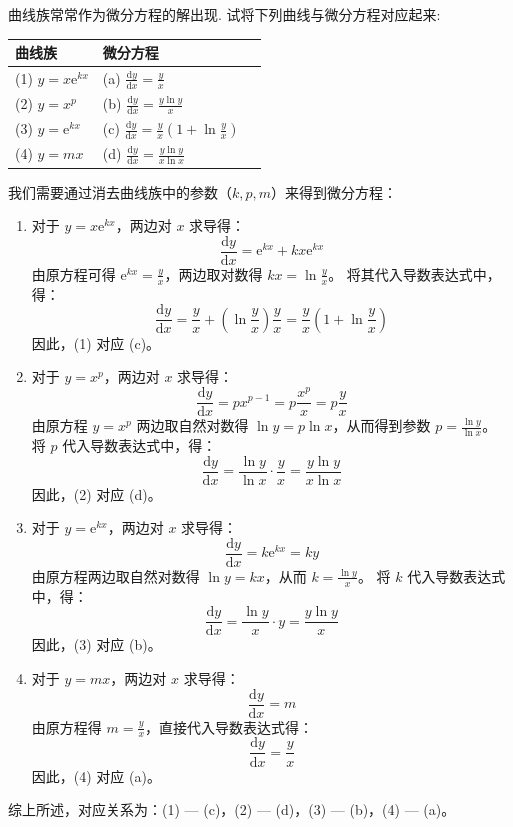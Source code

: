 \documentclass[lang=cn,11pt]{elegantbook}
\begin{document}
\begin{exercise}[曲线族对应微分方程]
曲线族常常作为微分方程的解出现. 试将下列曲线与微分方程对应起来:
\begin{center}
\begin{tabular}{@{}lll@{}}
\toprule
 \textbf{曲线族} & \textbf{微分方程} \\
\midrule
(1) $y=x\mathrm{e}^{kx}$ & (a) $\displaystyle \frac{\mathrm{d}y}{\mathrm{d}x}=\frac{y}{x}$ \\[6pt]
(2) $y=x^p$ & (b) $\displaystyle \frac{\mathrm{d}y}{\mathrm{d}x}=\frac{y\ln y}{x}$ \\[6pt]
(3) $y=\mathrm{e}^{kx}$ & (c) $\displaystyle \frac{\mathrm{d}y}{\mathrm{d}x}=\frac{y}{x}\left(1+\ln\frac{y}{x}\right)$ \\[6pt]
(4) $y=mx$ & (d) $\displaystyle \frac{\mathrm{d}y}{\mathrm{d}x}=\frac{y\ln y}{x\ln x}$ \\
\bottomrule
\end{tabular}
\end{center}
\end{exercise}
\begin{solution}
我们需要通过消去曲线族中的参数（$k, p, m$）来得到微分方程：
\begin{enumerate}
    \item[(1)] 对于 $y=x\mathrm{e}^{kx}$，两边对 $x$ 求导得：
    $$ \frac{\mathrm{d}y}{\mathrm{d}x} = \mathrm{e}^{kx} + kx\mathrm{e}^{kx} $$
    由原方程可得 $\displaystyle \mathrm{e}^{kx} = \frac{y}{x}$，两边取对数得 $\displaystyle kx = \ln\frac{y}{x}$。
    将其代入导数表达式中，得：
    $$ \frac{\mathrm{d}y}{\mathrm{d}x} = \frac{y}{x} + \left(\ln\frac{y}{x}\right)\frac{y}{x} = \frac{y}{x}\left(1+\ln\frac{y}{x}\right) $$
    因此，(1) 对应 (c)。
    \item[(2)] 对于 $y=x^p$，两边对 $x$ 求导得：
    $$ \frac{\mathrm{d}y}{\mathrm{d}x} = px^{p-1} = p\frac{x^p}{x} = p\frac{y}{x} $$
    由原方程 $y=x^p$ 两边取自然对数得 $\ln y = p\ln x$，从而得到参数 $\displaystyle p = \frac{\ln y}{\ln x}$。
    将 $p$ 代入导数表达式中，得：
    $$ \frac{\mathrm{d}y}{\mathrm{d}x} = \frac{\ln y}{\ln x} \cdot \frac{y}{x} = \frac{y\ln y}{x\ln x} $$
    因此，(2) 对应 (d)。
    \item[(3)] 对于 $y=\mathrm{e}^{kx}$，两边对 $x$ 求导得：
    $$ \frac{\mathrm{d}y}{\mathrm{d}x} = k\mathrm{e}^{kx} = ky $$
    由原方程两边取自然对数得 $\ln y = kx$，从而 $\displaystyle k = \frac{\ln y}{x}$。
    将 $k$ 代入导数表达式中，得：
    $$ \frac{\mathrm{d}y}{\mathrm{d}x} = \frac{\ln y}{x} \cdot y = \frac{y\ln y}{x} $$
    因此，(3) 对应 (b)。
    \item[(4)] 对于 $y=mx$，两边对 $x$ 求导得：
    $$ \frac{\mathrm{d}y}{\mathrm{d}x} = m $$
    由原方程得 $\displaystyle m = \frac{y}{x}$，直接代入导数表达式得：
    $$ \frac{\mathrm{d}y}{\mathrm{d}x} = \frac{y}{x} $$
    因此，(4) 对应 (a)。
\end{enumerate}
综上所述，对应关系为：(1) --- (c)，(2) --- (d)，(3) --- (b)，(4) --- (a)。
\end{solution}
\end{document}

